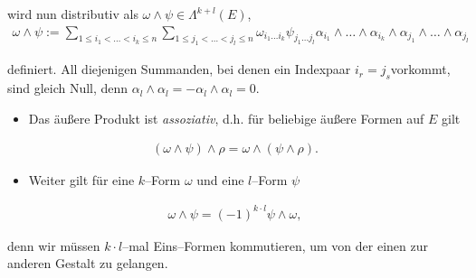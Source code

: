 wird nun distributiv als \(\omega\wedge\psi\in\Lambda^{k+l}(E)\),
\begin{align*}
\omega\wedge\psi := \sum_{1\leq i_1<\ldots<i_k\leq n} \sum_{1\leq
j_1<\ldots<j_l\leq n} \omega_{i_1\ldots i_k} \psi_{j_1\ldots j_l}
\alpha_{i_1}\wedge\ldots\wedge\alpha_{i_k}\wedge\alpha_{j_1}\wedge
\ldots\wedge\alpha_{j_l}
\end{align*}
\par
definiert. All diejenigen Summanden, bei denen ein Indexpaar \(i_r=j_s\)vorkommt, sind gleich Null, denn \(\alpha_l\wedge\alpha_l = -\alpha_l\wedge\alpha_l=0\).
\begin{itemize}
\item {} 
\par
Das äußere Produkt ist \emph{assoziativ}, d.h. für beliebige äußere Formen auf \(E\) gilt

\end{itemize}
\begin{align*}
(\omega\wedge\psi)\wedge\rho = \omega\wedge(\psi\wedge\rho).
\end{align*}\begin{itemize}
\item {} 
\par
Weiter gilt für eine \(k\)–Form \(\omega\) und eine \(l\)–Form \(\psi\)

\end{itemize}
\begin{align*}
\omega\wedge\psi = (-1)^{k\cdot l}\psi\wedge\omega,
\end{align*}
\par
denn wir müssen \(k\!\cdot\! l\)–mal Eins–Formen kommutieren, um von der einen
zur anderen Gestalt zu gelangen.
\label{vektoranalysis/multilinear:symplektische Form auf dem $\R^{2n}$}

